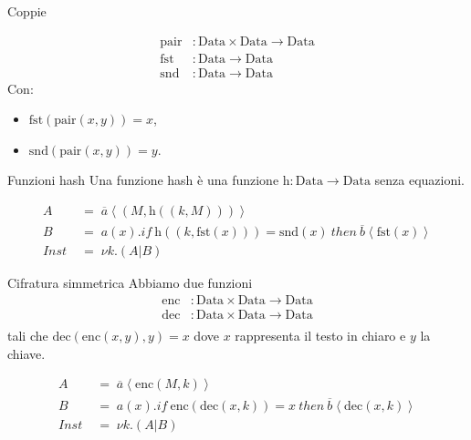 \documentclass{beamer}
\theoremstyle{plain}
\theoremstyle{definition}
\theoremstyle{remark}
\newcommand{\obar}[1]{\overline{#1}}
\newcommand{\pa}[1]{\left(#1\right)}
\newcommand{\ang}[1]{\left<#1\right>}
\begin{document}
\begin{frame}{Coppie}
  
  \begin{align*}
    \mathrm{pair} &: \mathrm{Data} \times \mathrm{Data} \rightarrow
                    \mathrm{Data} \\
    \mathrm{fst} &: \mathrm{Data} \rightarrow \mathrm{Data} \\
    \mathrm{snd} &: \mathrm{Data} \rightarrow \mathrm{Data}
  \end{align*}
  Con:
  \begin{itemize}
  \item $\mathrm{fst}\pa{\mathrm{pair}(x,y)} = x$,
  \item $\mathrm{snd}\pa{\mathrm{pair}(x,y)} = y$.
  \end{itemize}

\end{frame}

\begin{frame}{Funzioni hash}
  Una funzione hash \`e una funzione $\mathrm{h}: \mathrm{Data}
  \rightarrow \mathrm{Data}$ senza equazioni.
  
  \begin{align*}
    A & \;=\; \obar{a}\ang{ \pa{M,\mathrm{h}\pa{(k,M)}}} \\
    B & \;=\; a(x).if\ \mathrm{h}\pa{(k,\mathrm{fst}(x))} =
        \mathrm{snd}(x)\ then\ \obar{b}\ang{\mathrm{fst}(x)} \\
    Inst & \;=\; \nu k.\pa{ A | B } 
  \end{align*}
\end{frame}

\begin{frame}{Cifratura simmetrica}
  Abbiamo due funzioni
  \begin{align*}
    \mathrm{enc} &: \mathrm{Data} \times \mathrm{Data} \rightarrow
                   \mathrm{Data} \\
    \mathrm{dec} &: \mathrm{Data} \times \mathrm{Data} \rightarrow
                   \mathrm{Data} \\
  \end{align*}
  tali che $\mathrm{dec}\pa{\mathrm{enc}(x,y),y} = x$ dove $x$
  rappresenta il testo in chiaro e $y$ la chiave.
  \vfill
  
  \begin{align*}
    A & \;=\; \obar{a}\ang{\mathrm{enc}(M,k)} \\
    B & \;=\; a\pa{x}.if\ \mathrm{enc}\pa{ \mathrm{dec}(x,k)} =
        x\ then\ \obar{b}\ang{\mathrm{dec}(x,k)} \\
    Inst & \;=\; \nu k. \pa{ A|B}
  \end{align*}
\end{frame}
\end{document}
